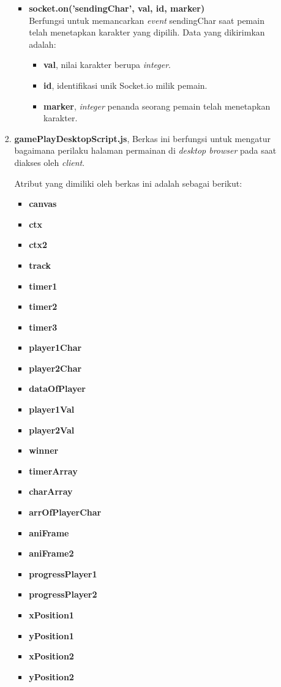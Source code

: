 \begin{enumerate}
\begin{enumerate}
\begin{enumerate}
\begin{itemize}
				\item \textbf{socket.on('sendingChar', {val, id, marker})} \\
				Berfungsi untuk memancarkan \textit{event} sendingChar saat pemain telah menetapkan karakter yang dipilih. Data yang dikirimkan adalah:
				\begin{itemize}
					\item \textbf{val}, nilai karakter berupa \textit{integer}.
					\item \textbf{id}, identifikasi unik Socket.io milik pemain.
					\item \textbf{marker}, \textit{integer} penanda seorang pemain telah menetapkan karakter.
				\end{itemize}
			\end{itemize}
			
			\item \textbf{gamePlayDesktopScript.js}, Berkas ini berfungsi untuk mengatur bagaimana perilaku halaman permainan di \textit{desktop browser} pada saat diakses oleh \textit{client}.
			
			Atribut yang dimiliki oleh berkas ini adalah sebagai berikut:
			\begin{itemize}
				\item \textbf{canvas}
				\item \textbf{ctx}
				\item \textbf{ctx2}
				\item \textbf{track}
				\item \textbf{timer1}
				\item \textbf{timer2}
				\item \textbf{timer3}
				\item \textbf{player1Char}
				\item \textbf{player2Char}
				\item \textbf{dataOfPlayer}
				\item \textbf{player1Val}
				\item \textbf{player2Val}
				\item \textbf{winner}
				\item \textbf{timerArray}
				\item \textbf{charArray}
				\item \textbf{arrOfPlayerChar}
				\item \textbf{aniFrame}
				\item \textbf{aniFrame2}
				\item \textbf{progressPlayer1}
				\item \textbf{progressPlayer2}
				\item \textbf{xPosition1}
				\item \textbf{yPosition1}
				\item \textbf{xPosition2}
				\item \textbf{yPosition2}
			\end{itemize}
			

\end{enumerate}
\end{enumerate}
\end{enumerate}

